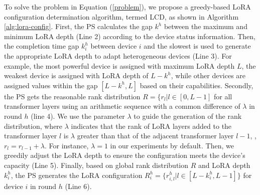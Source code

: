 To solve the problem in Equation (\ref{problem}), we propose a greedy-based LoRA configuration determination algorithm, termed LCD, as shown in Algorithm \ref{alg:lora-config}. 
First, the PS calculates the gap $k^h$ between the maximum and minimum LoRA depth (Line 2) according to the device status information. 
Then, the completion time gap $k_i^h$ between device $i$ and the slowest is used to generate the appropriate LoRA depth to adapt heterogeneous devices (Line 3). 
For example, the most powerful device is assigned with maximum LoRA depth $L$, the weakest device is assigned with LoRA depth of $L - k^h$, while other devices are assigned values within the gap $[L - k^h, L]$ based on their capabilities.
Secondly, the PS gets the reasonable rank distribution $R = \{r_l | l \in [0, L - 1]$ for all transformer layers using an arithmetic sequence with a common difference of $\lambda$ in round $h$ (line 4). 
We use the parameter $\lambda$ to guide the generation of the rank distribution, where $\lambda$ indicates that the rank of LoRA layers added to the transformer layer $l$ is $\lambda$ greater than that of the adjacent transformer layer $l-1$, \ie, $r_l = r_{l - 1} + \lambda$.
For instance, $\lambda = 1$ in our experiments by default. 
Then, we greedily adjust the LoRA depth to ensure the configuration meets the device's capacity (Line 5).
Finally, based on global rank distribution $R$ and LoRA depth $k_i^h$, the PS generates the LoRA configuration $R_i^h = \{ r_{i,l}^h| l \in [L - k_i^h, L - 1] \}$ for device $i$ in round $h$ (Line 6).
\vspace{-0.4cm}

